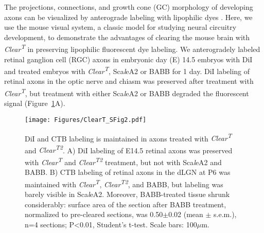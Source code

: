 The projections, connections, and growth cone (GC) morphology of developing axons can be visualized by anterograde labeling with lipophilic dyes \cite{little2009specificity,bielle2011emergent}.
Here, we use the mouse visual system, a classic model for studying neural circuitry development, to demonstrate the advantages of clearing the mouse brain with \emph{Clear\textsuperscript{T}} in preserving lipophilic fluorescent dye labeling.
We anterogradely labeled retinal ganglion cell (RGC) axons in embryonic day (E) 14.5 embryos with DiI and treated embryos with \emph{Clear\textsuperscript{T}}, Sca\emph{l}eA2 or BABB for 1 day.
DiI labeling of retinal axons in the optic nerve and chiasm was preserved after treatment with \emph{Clear\textsuperscript{T}}, but treatment with either Sca\emph{l}eA2 or BABB degraded the fluorescent signal (Figure~\ref{ClearTSFig2}A).
\begin{figure}[hbtp]
    \begin{center}
        \texttt{[image: Figures/ClearT\_SFig2.pdf]}
        \caption[DiI and CTB labeling is maintained in axons treated with \emph{Clear\textsuperscript{T}} and \emph{Clear\textsuperscript{T2}}.]
        {DiI and CTB labeling is maintained in axons treated with \emph{Clear\textsuperscript{T}} and \emph{Clear\textsuperscript{T2}}.
        A) DiI labeling of E14.5 retinal axons was preserved with \emph{Clear\textsuperscript{T}} and \emph{Clear\textsuperscript{T2}} treatment, but not with Sca\emph{l}eA2 and BABB.
        B) CTB labeling of retinal axons in the dLGN at P6 was maintained with \emph{Clear\textsuperscript{T}}, \emph{Clear\textsuperscript{T2}}, and BABB, but labeling was barely visible in Sca\emph{l}eA2.
        Moreover, BABB-treated tissue shrunk considerably: surface area of the section after BABB treatment, normalized to pre-cleared sections, was 0.50$\pm$0.02 (mean $\pm$ s.e.m.), n=4 sections; P<0.01, Student’s t-test.
        Scale bars: 100$\mu$m.
        }
        \label{ClearTSFig2}
    \end{center}
\end{figure}


